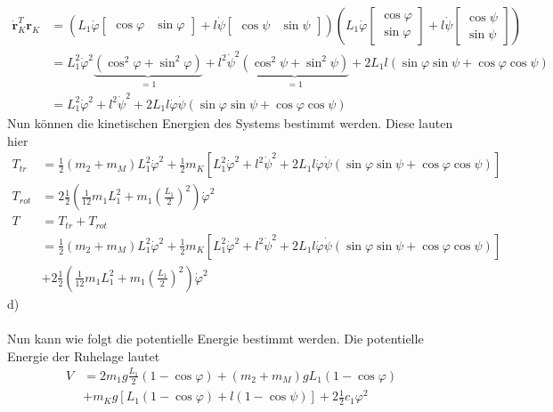 \begin{align*}
	\dot{\textbf{r}}_K^T\textbf{r}_K &= \left(L_1\dot{\varphi}\left[\begin{matrix}
		\cos\varphi &
		\sin\varphi
		\end{matrix}\right]
	+
	l\dot{\psi}\left[\begin{matrix}
	\cos\psi &
	\sin\psi
	\end{matrix}\right]\right)
	\left(L_1\dot{\varphi}\left[\begin{matrix}
		\cos\varphi \\
		\sin\varphi
		\end{matrix}\right]
	+
	l\dot{\psi}\left[\begin{matrix}
	\cos\psi\\
	\sin\psi
	\end{matrix}\right]\right) \\
	&= L_1^2\dot{\varphi}^2\underbrace{\left(\cos^2\varphi + \sin^2\varphi\right)}_{=1} + l^2\dot{\psi}^2\underbrace{\left( \cos^2\psi + \sin^2\psi\right)}_{=1} + 2L_1l\left(\sin\varphi\sin\psi + \cos\varphi\cos\psi\right) \\
	&= L_1^2\dot{\varphi}^2 + l^2\dot{\psi}^2 + 2L_1l\dot{\varphi}\dot{\psi}\left(\sin\varphi\sin\psi + \cos\varphi\cos\psi\right)
\end{align*}
\newpage
Nun können die kinetischen Energien des Systems bestimmt werden. Diese lauten hier
\begin{align*}
	T_{tr} &= \frac{1}{2} \left(m_2 + m_M\right) L_1^2\dot{\varphi}^2 + \frac{1}{2} m_K \left[ L_1^2\dot{\varphi}^2 + l^2\dot{\psi}^2 + 2L_1l\dot{\varphi}\dot{\psi}\left(\sin\varphi\sin\psi + \cos\varphi\cos\psi\right)\right] \\
	T_{rot} &= 2 \frac{1}{2} \left(\frac{1}{12}m_1L_1^2 + m_1\left(\frac{L_1}{2}\right)^2\right)\dot{\varphi}^2 \\
	T &= T_{tr} + T_{rot} \\
	  &= \frac{1}{2} \left(m_2 + m_M\right) L_1^2\dot{\varphi}^2 + \frac{1}{2} m_K \left[ L_1^2\dot{\varphi}^2 + l^2\dot{\psi}^2 + 2L_1l\dot{\varphi}\dot{\psi}\left(\sin\varphi\sin\psi + \cos\varphi\cos\psi\right)\right] \\
	  &+ 2\frac{1}{2} \left(\frac{1}{12}m_1L_1^2 + m_1\left(\frac{L_1}{2}\right)^2\right)\dot{\varphi}^2
\end{align*}
d) \\ \\
Nun kann wie folgt die potentielle Energie bestimmt werden. Die potentielle Energie der Ruhelage lautet
\begin{align*}
	V &= 2m_1g\frac{L_1}{2}\left(1-\cos\varphi\right) + \left(m_2 + m_M\right)gL_1 \left(1 - \cos\varphi\right) \\
	&+ m_Kg\left[L_1\left(1-\cos\varphi\right) +l\left(1 - \cos\psi\right)\right] + 2 \frac{1}{2}c_1\varphi^2
\end{align*}

